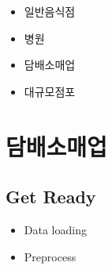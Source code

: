 \documentclass[
]{book}
\providecommand{\tightlist}{%
  \setlength{\itemsep}{0pt}\setlength{\parskip}{0pt}}
\begin{document}
\begin{itemize}
\tightlist
\item
  일반음식점
\item
  병원
\item
  담배소매업
\item
  대규모점포
\end{itemize}

\hypertarget{uxb2f4uxbc30uxc18cuxb9e4uxc5c5}{%
\section{담배소매업}\label{uxb2f4uxbc30uxc18cuxb9e4uxc5c5}}

\hypertarget{get-ready-1}{%
\subsection{Get Ready}\label{get-ready-1}}

\begin{itemize}
\item
  Data loading
\item
  Preprocess
\end{itemize}
\end{document}
